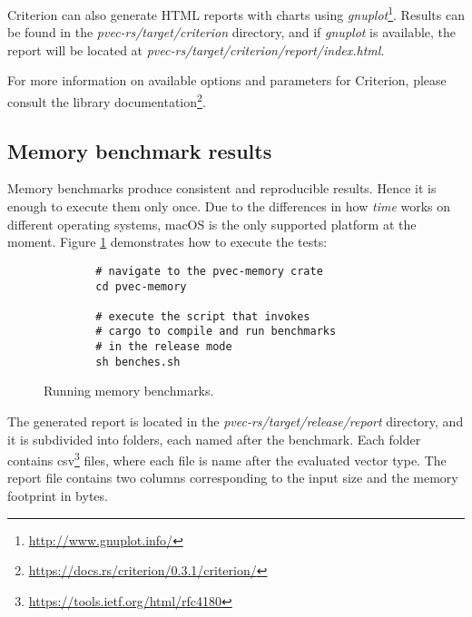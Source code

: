 Criterion can also generate HTML reports with charts using \emph{gnuplot}\footnote{\url{http://www.gnuplot.info/}}. Results can be found in the \emph{pvec-rs/target/criterion} directory, and if \emph{gnuplot} is available, the report will be located at \emph{pvec-rs/target/criterion/report/index.html}.

For more information on available options and parameters for Criterion, please consult the library documentation\footnote{\url{https://docs.rs/criterion/0.3.1/criterion/}}.

\subsection{Memory benchmark results}
Memory benchmarks produce consistent and reproducible results. Hence it is enough to execute them only once. Due to the differences in how \emph{time} works on different operating systems, macOS is the only supported platform at the moment. Figure \ref{fig:memory-benches} demonstrates how to execute the tests:

\begin{figure}[!htbp]
    \centering

    \begin{verbatim}
        # navigate to the pvec-memory crate
        cd pvec-memory

        # execute the script that invokes
        # cargo to compile and run benchmarks
        # in the release mode
        sh benches.sh
    \end{verbatim}

    \caption{Running memory benchmarks.}
    \label{fig:memory-benches}
\end{figure}

The generated report is located in the \emph{pvec-rs/target/release/report} directory, and it is subdivided into folders, each named after the benchmark. Each folder contains csv\footnote{\url{https://tools.ietf.org/html/rfc4180}} files, where each file is name after the evaluated vector type. The report file contains two columns corresponding to the input size and the memory footprint in bytes.
